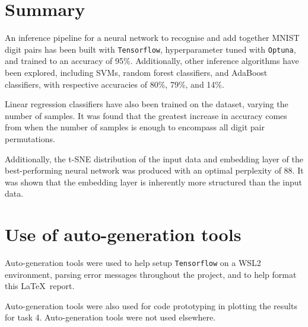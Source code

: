 \documentclass[11pt,a4paper]{article}
\begin{document}
\section{Summary}
An inference pipeline for a neural network to recognise and add together MNIST digit pairs has been built with \texttt{Tensorflow}, hyperparameter tuned with \texttt{Optuna}, and trained to an accuracy of 95\%. Additionally, other inference algorithms have been explored, including SVMs, random forest classifiers, and AdaBoost classifiers, with respective accuracies of 80\%, 79\%, and 14\%. 

Linear regression classifiers have also been trained on the dataset, varying the number of samples. It was found that the greatest increase in accuracy comes from when the number of samples is enough to encompass all digit pair permutations.

Additionally, the t-SNE distribution of the input data and embedding layer of the best-performing neural network was produced with an optimal perplexity of 88. It was shown that the embedding layer is inherently more structured than the input data.
\clearpage


\appendix
\section{Use of auto-generation tools}
Auto-generation tools were used to help setup \texttt{Tensorflow} on a WSL2 environment, parsing error messages throughout the project, and to help format this \LaTeX\ report.

Auto-generation tools were also used for code prototyping in plotting the results for task 4. Auto-generation tools were not used elsewhere.
\end{document}
